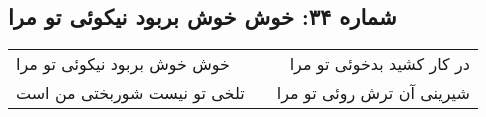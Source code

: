 \begin{center}
\section*{شماره ۳۴: خوش خوش بربود نیکوئی تو مرا}
\label{sec:034}
\begin{longtable}{l p{0.5cm} r}
خوش خوش بربود نیکوئی تو مرا
&&
در کار کشید بدخوئی تو مرا
\\
تلخی تو نیست شوربختی من است
&&
شیرینی آن ترش روئی تو مرا
\\
\end{longtable}
\end{center}

